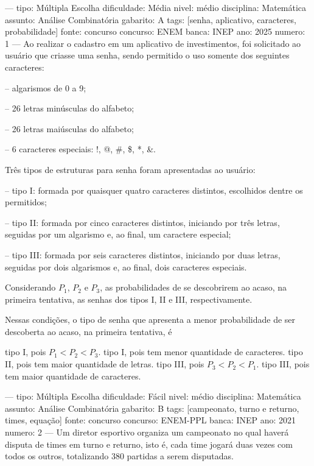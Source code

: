 
---
tipo: Múltipla Escolha
dificuldade: Média
nivel: médio
disciplina: Matemática
assunto: Análise Combinatória
gabarito: A
tags: [senha, aplicativo, caracteres, probabilidade]
fonte: concurso
concurso: ENEM
banca: INEP
ano: 2025
numero: 1
---
\question
Ao realizar o cadastro em um aplicativo de investimentos, foi solicitado ao usuário que criasse uma senha, sendo permitido o uso somente dos seguintes caracteres:

-- algarismos de 0 a 9;

-- 26 letras minúsculas do alfabeto;

-- 26 letras maiúsculas do alfabeto;

-- 6 caracteres especiais: !, @, \#, \$, *, \&.

Três tipos de estruturas para senha foram apresentadas ao usuário:

-- tipo I: formada por quaisquer quatro caracteres distintos, escolhidos dentre os permitidos;

-- tipo II: formada por cinco caracteres distintos, iniciando por três letras, seguidas por um algarismo e, ao final, um caractere especial;

-- tipo III: formada por seis caracteres distintos, iniciando por duas letras, seguidas por dois algarismos e, ao final, dois caracteres especiais.

Considerando \( P_1 \), \( P_2 \) e \( P_3 \), as probabilidades de se descobrirem ao acaso, na primeira tentativa, as senhas dos tipos I, II e III, respectivamente.

Nessas condições, o tipo de senha que apresenta a menor probabilidade de ser descoberta ao acaso, na primeira tentativa, é
\begin{choices}
\correctchoice tipo I, pois \( P_1 < P_2 < P_3 \).
\choice tipo I, pois tem menor quantidade de caracteres.
\choice tipo II, pois tem maior quantidade de letras.
\choice tipo III, pois \( P_3 < P_2 < P_1 \).
\choice tipo III, pois tem maior quantidade de caracteres.
\end{choices}

---
tipo: Múltipla Escolha
dificuldade: Fácil
nivel: médio
disciplina: Matemática
assunto: Análise Combinatória
gabarito: B
tags: [campeonato, turno e returno, times, equação]
fonte: concurso
concurso: ENEM-PPL
banca: INEP
ano: 2021
numero: 2
---
\question
Um diretor esportivo organiza um campeonato no qual haverá disputa de times em turno e returno, isto é, cada time jogará duas vezes com todos os outros, totalizando 380 partidas a serem disputadas.

